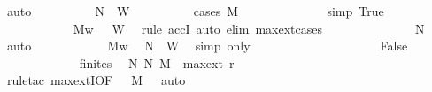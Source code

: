 \begin{isabellebody}
\ auto\isanewline
\isanewline
\ \ \ \ \ \ \ \ \isamarkupfalse%
\ {\isachardoublequoteopen}{\isacharquery}{\kern0pt}N{}\ {\isasymin}\ {\isacharquery}{\kern0pt}W{\isachardoublequoteclose}\isanewline
\ \ \ \ \ \ \ \ \isamarkupfalse%
\ {\isacharparenleft}{\kern0pt}cases\ {\isachardoublequoteopen}M\ {\isacharequal}{\kern0pt}\ {\isacharbraceleft}{\kern0pt}{\isacharbraceright}{\kern0pt}{\isachardoublequoteclose}{\isacharparenright}{\kern0pt}\isanewline
\ \ \ \ \ \ \ \ \ \ \isamarkupfalse%
\ {\isacharbrackleft}{\kern0pt}simp{\isacharbrackright}{\kern0pt}{\isacharcolon}{\kern0pt}\ True\isanewline
\ \ \ \ \ \ \ \ \ \ \isamarkupfalse%
\ Mw{\isacharcolon}{\kern0pt}\ {\isachardoublequoteopen}{\isacharbraceleft}{\kern0pt}{\isacharbraceright}{\kern0pt}\ {\isasymin}\ {\isacharquery}{\kern0pt}W{\isachardoublequoteclose}\ \isamarkupfalse%
\ {\isacharparenleft}{\kern0pt}rule\ accI{\isacharparenright}{\kern0pt}\ {\isacharparenleft}{\kern0pt}auto\ elim{\isacharcolon}{\kern0pt}\ max{\isacharunderscore}{\kern0pt}ext{\isachardot}{\kern0pt}cases{\isacharparenright}{\kern0pt}\isanewline
\ \ \ \ \ \ \ \ \ \ \isamarkupfalse%
\ {\isacharasterisk}{\kern0pt}\ \isamarkupfalse%
\ {\isachardoublequoteopen}{\isacharquery}{\kern0pt}N{}\ {\isacharequal}{\kern0pt}\ {\isacharbraceleft}{\kern0pt}{\isacharbraceright}{\kern0pt}{\isachardoublequoteclose}\ \isamarkupfalse%
\ auto\isanewline
\ \ \ \ \ \ \ \ \ \ \isamarkupfalse%
\ Mw\ \isamarkupfalse%
\ {\isachardoublequoteopen}{\isacharquery}{\kern0pt}N{}\ {\isasymin}\ {\isacharquery}{\kern0pt}W{\isachardoublequoteclose}\ \isamarkupfalse%
\ {\isacharparenleft}{\kern0pt}simp\ only{\isacharcolon}{\kern0pt}{\isacharparenright}{\kern0pt}\isanewline
\ \ \ \ \ \ \ \ \isamarkupfalse%
\isanewline
\ \ \ \ \ \ \ \ \ \ \isamarkupfalse%
\ False\isanewline
\ \ \ \ \ \ \ \ \ \ \isamarkupfalse%
\ {\isacharasterisk}{\kern0pt}\ finites\ \isamarkupfalse%
\ N{}{\isacharcolon}{\kern0pt}\ {\isachardoublequoteopen}{\isacharparenleft}{\kern0pt}{\isacharquery}{\kern0pt}N{}{\isacharcomma}{\kern0pt}\ M{\isacharparenright}{\kern0pt}\ {\isasymin}\ max{\isacharunderscore}{\kern0pt}ext\ r{\isachardoublequoteclose}\isanewline
\ \ \ \ \ \ \ \ \ \ \ \ \isamarkupfalse%
\ {\isacharparenleft}{\kern0pt}rule{\isacharunderscore}{\kern0pt}tac\ max{\isacharunderscore}{\kern0pt}extI{\isacharbrackleft}{\kern0pt}OF\ {\isacharunderscore}{\kern0pt}\ {\isacharunderscore}{\kern0pt}\ {\isacartoucheopen}M\ {\isasymnoteq}\ {\isacharbraceleft}{\kern0pt}{\isacharbraceright}{\kern0pt}{\isacartoucheclose}{\isacharbrackright}{\kern0pt}{\isacharparenright}{\kern0pt}\ auto\isanewline

\end{isabellebody}
